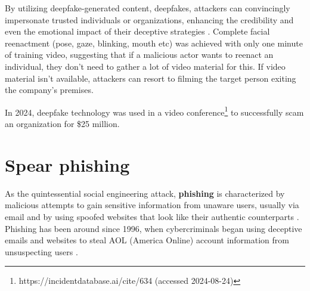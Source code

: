 By utilizing deepfake-generated content, deepfakes, attackers can convincingly impersonate trusted individuals or organizations, enhancing the credibility and even the emotional impact of their deceptive strategies \citep{mirskyTheCreationAndDetectionOfDeepfakes2021}. Complete facial reenactment (pose, gaze, blinking, mouth etc) was achieved with only one minute of training video, suggesting that if a malicious actor wants to reenact an individual, they don't need to gather a lot of video material for this. If video material isn't available, attackers can resort to filming the target person exiting the company's premises.

In 2024, deepfake technology was used in a video conference\footnote{https://incidentdatabase.ai/cite/634 (accessed 2024-08-24)} to successfully scam an organization for \$25 million.
















\section{Spear phishing}
\begin{comment}
Phishing & spear phishing

What to cover:
    - What is phishing (via email and ALSO other means)
    - Spear phishing a more targeted form of phishing
    - How ChatGPT can be used to improve scam messages
    - ChatGPT:n eettisten ohjeistusten ohittaminen on jo käsitelty kohdassa Chatbots

\end{comment}

As the quintessential social engineering attack, \textbf{phishing} is characterized by malicious attempts to gain sensitive information from unaware users, usually via email and by using spoofed websites that look like their authentic counterparts \citep{basitComprehensiveSurveyAIenabledPhishingAttacks2021}. Phishing has been around since 1996, when cybercriminals began using deceptive emails and websites to steal AOL (America Online) account information from unsuspecting users \citep{wangDefiningSocialEngineering2020}.


